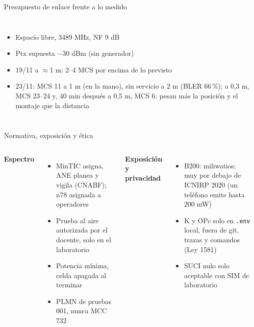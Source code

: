 \documentclass[aspectratio=169,10pt]{beamer}
\providecommand{\datosgraficamcs}{\addplot[red,only marks,mark=square*,error bars/.cd,y dir=both,y explicit]
  coordinates {(1,25) +- (0,1)};\addlegendentry{Medido 19/11}}
\begin{document}
\begin{frame}{Presupuesto de enlace frente a lo medido}
\begin{columns}[T]
\small
\begin{itemize}
  \item Espacio libre, 3489 MHz, NF 9 dB
  \item Ptx supuesta $-30$ dBm (sin generador)
  \item 19/11 a $\approx$1 m: 2--4 MCS por encima de lo previsto
  \item 23/11: MCS 11 a 1 m (en la mano), \alert{sin servicio a 2 m} (BLER 66\,\%); a 0,3 m, MCS 23--24 y, 40 min después a 0,5 m, MCS 6: pesan más la posición y el montaje que la distancia
\end{itemize}
\end{columns}
\end{frame}

\begin{frame}{Normativa, exposición y ética}
\begin{columns}[T]
\textbf{Espectro}
\begin{itemize}\small
  \item MinTIC asigna, ANE planea y vigila (CNABF); n78 asignada a operadores
  \item Prueba al aire autorizada por el docente, solo en el laboratorio
  \item Potencia mínima, celda apagada al terminar
  \item PLMN de pruebas 001, nunca MCC 732
\end{itemize}
\textbf{Exposición y privacidad}
\begin{itemize}\small
  \item B200: miliwatios; muy por debajo de ICNIRP 2020 (un teléfono emite hasta 200 mW)
  \item K y OPc solo en \texttt{.env} local, fuera de git, trazas y comandos (Ley 1581)
  \item SUCI nulo solo aceptable con SIM de laboratorio
\end{itemize}
\end{columns}
\end{frame}
\end{document}
